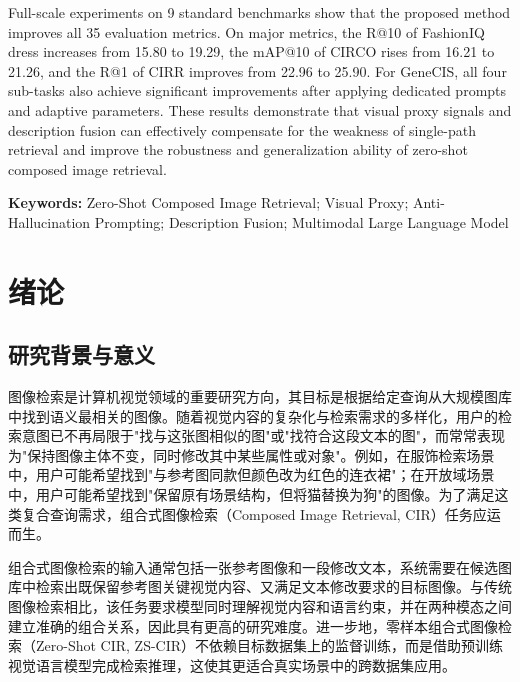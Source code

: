 \documentclass[12pt,a4paper,UTF8,oneside,openany]{ctexrep}
\begin{document}
Full-scale experiments on 9 standard benchmarks show that the proposed method improves all 35 evaluation metrics. On major metrics, the R@10 of FashionIQ dress increases from 15.80 to 19.29, the mAP@10 of CIRCO rises from 16.21 to 21.26, and the R@1 of CIRR improves from 22.96 to 25.90. For GeneCIS, all four sub-tasks also achieve significant improvements after applying dedicated prompts and adaptive parameters. These results demonstrate that visual proxy signals and description fusion can effectively compensate for the weakness of single-path retrieval and improve the robustness and generalization ability of zero-shot composed image retrieval.

\vspace{1em}
\noindent\textbf{Keywords:} Zero-Shot Composed Image Retrieval; Visual Proxy; Anti-Hallucination Prompting; Description Fusion; Multimodal Large Language Model

\tableofcontents
\clearpage

\setcounter{page}{1}

\chapter{绪论}

\section{研究背景与意义}

图像检索是计算机视觉领域的重要研究方向，其目标是根据给定查询从大规模图库中找到语义最相关的图像\cite{datta2008image}。随着视觉内容的复杂化与检索需求的多样化，用户的检索意图已不再局限于"找与这张图相似的图"或"找符合这段文本的图"，而常常表现为"保持图像主体不变，同时修改其中某些属性或对象"。例如，在服饰检索场景中，用户可能希望找到"与参考图同款但颜色改为红色的连衣裙"；在开放域场景中，用户可能希望找到"保留原有场景结构，但将猫替换为狗"的图像。为了满足这类复合查询需求，组合式图像检索（Composed Image Retrieval, CIR）任务应运而生\cite{vo2019composing, song2025survey}。

组合式图像检索的输入通常包括一张参考图像和一段修改文本，系统需要在候选图库中检索出既保留参考图关键视觉内容、又满足文本修改要求的目标图像。与传统图像检索相比，该任务要求模型同时理解视觉内容和语言约束，并在两种模态之间建立准确的组合关系，因此具有更高的研究难度。进一步地，零样本组合式图像检索（Zero-Shot CIR, ZS-CIR）不依赖目标数据集上的监督训练，而是借助预训练视觉语言模型完成检索推理，这使其更适合真实场景中的跨数据集应用。
\end{document}
